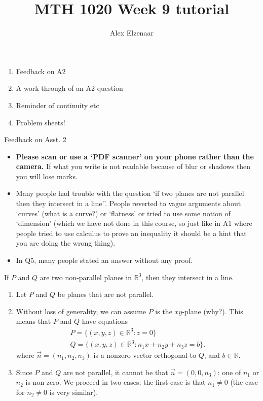 \documentclass{beamer}
\title{MTH 1020 Week 9 tutorial}
\author{Alex Elzenaar}
\newcommand{\R}{\mathbb{R}}
\begin{document}
\begin{frame}{\inserttitle}
\begin{enumerate}
  \item Feedback on A2
  \item A work through of an A2 question
  \item Reminder of continuity etc
  \item Problem sheets!
\end{enumerate}
\end{frame}


\begin{frame}{Feedback on Asst. 2}

  \begin{itemize}
    \item \textbf{Please scan or use a `PDF scanner' on your phone rather than the camera.} If what you write is not readable because of blur or shadows then you will lose marks.
    \item Many people had trouble with the question `if two planes are not parallel then they intersect in a line''. People reverted to vague arguments about `curves' (what is a curve?)
          or `flatness' or tried to use some notion of `dimension' (which we have not done in this course, so just like in A1 where people tried to use calculus to prove an inequality
          it should be a hint that you are doing the wrong thing).
    \item In Q5, many people stated an answer without any proof.
  \end{itemize}

\end{frame}


\begin{frame}

\begin{theorem}
  If $ P $ and $ Q $ are two non-parallel planes in $ \R^3 $, then they intersect in a line.
\end{theorem}

\begin{enumerate}
  \item Let $ P $ and $ Q $ be planes that are not parallel.
  \item Without loss of generality, we can assume $P$ is the $ xy$-plane (why?). This means that $ P $ and $ Q $ have equations
        \begin{gather*}
          P = \{ (x,y,z) \in \R^3 : z = 0 \}\\
          Q = \{ (x,y,z) \in \R^3 : n_1 x + n_2 y + n_3 z = b \}.
        \end{gather*}
        where $ \vec{n} = (n_1,n_2,n_3) $ is a nonzero vector orthogonal to $ Q $, and $ b \in \R $.
  \item Since $ P $ and $ Q $ are not parallel, it cannot be that $ \vec{n} = (0,0,n_3) $: one of $ n_1 $ or $ n_2 $ is non-zero. We proceed in two cases; the first case is
        that $ n_1 \neq 0 $ (the case for $ n_2 \neq 0 $ is very similar).
\end{enumerate}
\end{frame}
\end{document}
